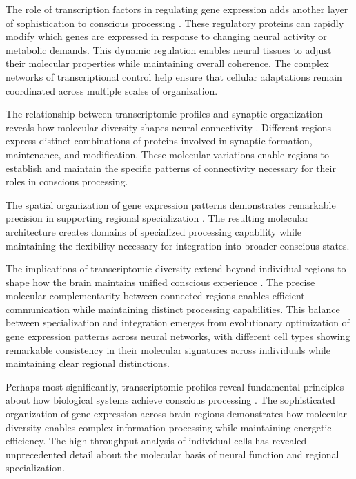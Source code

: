 The role of transcription factors in regulating gene expression adds another layer of sophistication to conscious processing \cite{Nowakowski2017}. These regulatory proteins can rapidly modify which genes are expressed in response to changing neural activity or metabolic demands. This dynamic regulation enables neural tissues to adjust their molecular properties while maintaining overall coherence. The complex networks of transcriptional control help ensure that cellular adaptations remain coordinated across multiple scales of organization.

The relationship between transcriptomic profiles and synaptic organization reveals how molecular diversity shapes neural connectivity \cite{Angulo2022}. Different regions express distinct combinations of proteins involved in synaptic formation, maintenance, and modification. These molecular variations enable regions to establish and maintain the specific patterns of connectivity necessary for their roles in conscious processing.

The spatial organization of gene expression patterns demonstrates remarkable precision in supporting regional specialization \cite{Zeng2017}. The resulting molecular architecture creates domains of specialized processing capability while maintaining the flexibility necessary for integration into broader conscious states.

The implications of transcriptomic diversity extend beyond individual regions to shape how the brain maintains unified conscious experience \cite{Tasic2018}. The precise molecular complementarity between connected regions enables efficient communication while maintaining distinct processing capabilities. This balance between specialization and integration emerges from evolutionary optimization of gene expression patterns across neural networks, with different cell types showing remarkable consistency in their molecular signatures across individuals while maintaining clear regional distinctions.

Perhaps most significantly, transcriptomic profiles reveal fundamental principles about how biological systems achieve conscious processing \cite{Macosko2015}. The sophisticated organization of gene expression across brain regions demonstrates how molecular diversity enables complex information processing while maintaining energetic efficiency. The high-throughput analysis of individual cells has revealed unprecedented detail about the molecular basis of neural function and regional specialization.

